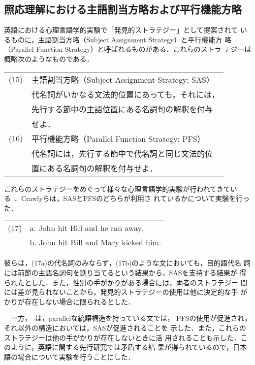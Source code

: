 \subsection{照応理解における主語割当方略および平行機能方略}

  英語における心理言語学的実験で「発見的ストラテジー」として提案されて
  いるものに，主語割当方略（Subject Assignment Strategy）と平行機能方
  略（Parallel Function Strategy）と呼ばれるものがある．これらのストラ
  テジーは概略次のようなものである．

\vspace{3mm}
\begin{tabular}{cl}
(15)&主語割当方略（Subject Assignment Strategy; SAS）\\
　　& 代名詞がいかなる文法的位置にあっても，それには，\\
    & 先行する節中の主語位置にある名詞句の解釈を付与  \\
    & せよ．\\
(16)&平行機能方略（Parallel Function Strategy; PFS）\\
    & 代名詞には，先行する節中で代名詞と同じ文法的位 \\
    & 置にある名詞句の解釈を付与せよ．\\
\end{tabular}
\vspace{3mm}

  これらのストラテジーをめぐって様々な心理言語学的実験が行われてきてい
る~\cite{crawly:1990}．Crawlyらは，SASとPFSのどちらが利用さ
れているかについて実験を行った．

\vspace{3mm}
\begin{tabular}{cl}
(17)& a. John hit Bill and he ran away.\\
    & b. John hit Bill and Mary kicked him.\\
\end{tabular}
\vspace{3mm}

彼らは，(17a)の代名詞のみならず，(17b)のような文においても，目的語代名
詞には前節の主語名詞句を割り当てるという結果から，SASを支持する結果が
得られたとした．また，性別の手がかりがある場合には，両者のストラテジー
間には差が見られないことから，発見的ストラテジーの使用は他に決定的な手
がかりが存在しない場合に限られるとした．

　一方，~\cite{smyth:1994}は，parallelな統語構造を持っている文では，
PFSの使用が促進され，それ以外の構造においては，SASが促進されることを
示した．また，これらのストラテジーは他の手がかりが存在しないときに活
用されることも示した．このように，英語に関する先行研究では矛盾する結
果が得られているので，日本語の場合について実験を行うことにした．

